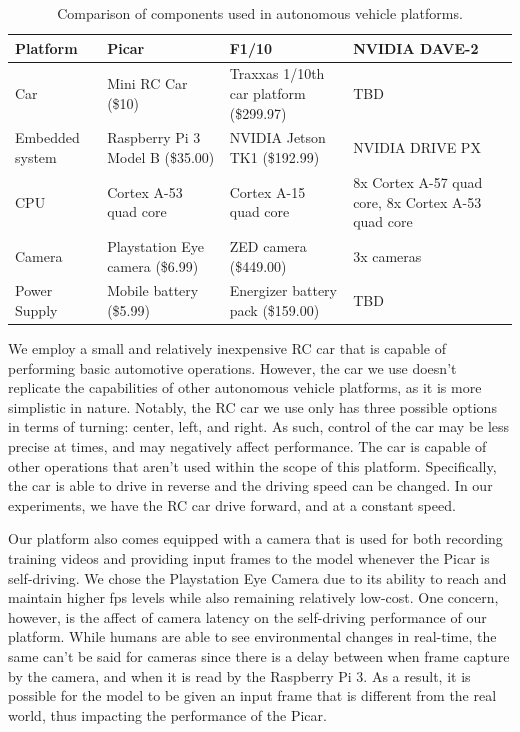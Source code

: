 \documentclass[10pt, conference]{IEEEtran}
\begin{document}
\begin{table}[h]
  \centering
  \begin{tabular} {| l | l | l | l | l |}
    \hline
    \textbf{Platform} & \textbf{Picar} & \textbf{F1/10} & \textbf{NVIDIA DAVE-2}\\ \hline 
    Car & Mini RC Car (\$10) & Traxxas 1/10th car platform (\$299.97) & TBD\\ \hline
    Embedded system & Raspberry Pi 3 Model B (\$35.00) & NVIDIA Jetson TK1 (\$192.99) & NVIDIA DRIVE PX \\ \hline
    CPU & Cortex A-53 quad core & Cortex A-15 quad core & 8x Cortex A-57 quad core, 8x Cortex A-53 quad core \\ \hline
    Camera & Playstation Eye camera (\$6.99) & ZED camera (\$449.00) & 3x cameras\\ \hline
    Power Supply & Mobile battery (\$5.99) & Energizer battery pack (\$159.00) & TBD\\
    \hline
  \end{tabular}
  \caption{Comparison of components used in autonomous vehicle platforms.}
\end{table}

We employ a small and relatively inexpensive RC car that is capable of performing basic automotive 
operations. However, the car we use doesn't replicate the capabilities of other autonomous vehicle 
platforms, as it is more simplistic in nature. Notably, the RC car we use only has three possible 
options in terms of turning: center, left, and right. As such, control of the car may be less precise at 
times, and may negatively affect performance. The car is capable of other operations that aren't used 
within the scope of this platform. Specifically, the car is able to drive in reverse and the driving 
speed can be changed. In our experiments, we have the RC car drive forward, and at a constant speed.

Our platform also comes equipped with a camera that is used for both recording training videos and 
providing input frames to the model whenever the Picar is self-driving. We chose the Playstation Eye 
Camera due to its ability to reach and maintain higher fps levels while also remaining relatively 
low-cost. One concern, however, is the affect of camera latency on the self-driving performance of our 
platform. While humans are able to see environmental changes in real-time, the same can't be said for 
cameras since there is a delay between when frame capture by the camera, and when it is read by the 
Raspberry Pi 3. As a result, it is possible for the model to be given an input frame that is different 
from the real world, thus impacting the performance of the Picar.
\end{document}
